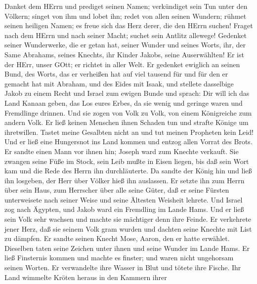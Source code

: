  Danket dem HErrn und prediget seinen Namen; verkündiget
sein Tun unter den Völkern;  singet von ihm und lobet ihn;
redet von allen seinen Wundern;  rühmet seinen heiligen
Namen; es freue sich das Herz derer, die den HErrn suchen! 
Fraget nach dem HErrn und nach seiner Macht; suchet sein Antlitz
allewege!  Gedenket seiner Wunderwerke, die er getan hat,
seiner Wunder und seines Worts,  ihr, der Same Abrahams,
seines Knechts, ihr Kinder Jakobs, seine Auserwählten!  Er
ist der HErr, unser GOtt; er richtet in aller Welt.  Er
gedenket ewiglich an seinen Bund, des Worts, das er verheißen hat auf
viel tausend für und für  den er gemacht hat mit Abraham,
und des Eides mit Isaak,  und stellete dasselbige Jakob zu
einem Recht und Israel zum ewigen Bunde  und sprach: Dir
will ich das Land Kanaan geben, das Los eures Erbes,  da
sie wenig und geringe waren und Fremdlinge drinnen.  Und
sie zogen von Volk zu Volk, von einem Königreiche zum andern Volk.
 Er ließ keinen Menschen ihnen Schaden tun und strafte
Könige um ihretwillen.  Tastet meine Gesalbten nicht an und
tut meinen Propheten kein Leid!  Und er ließ eine
Hungersnot ins Land kommen und entzog allen Vorrat des Brots.
 Er sandte einen Mann vor ihnen hin; Joseph ward zum
Knechte verkauft.  Sie zwangen seine Füße im Stock, sein
Leib mußte in Eisen liegen,  bis daß sein Wort kam und die
Rede des Herrn ihn durchläuterte.  Da sandte der König hin
und ließ ihn losgeben, der Herr über Völker hieß ihn auslassen.
 Er setzte ihn zum Herrn über sein Haus, zum Herrscher über
alle seine Güter,  daß er seine Fürsten unterweisete nach
seiner Weise und seine Ältesten Weisheit lehrete.  Und
Israel zog nach Ägypten, und Jakob ward ein Fremdling im Lande Hams.
 Und er ließ sein Volk sehr wachsen und machte sie
mächtiger denn ihre Feinde.  Er verkehrete jener Herz, daß
sie seinem Volk gram wurden und dachten seine Knechte mit List zu
dämpfen.  Er sandte seinen Knecht Mose, Aaron, den er hatte
erwählet.  Dieselben taten seine Zeichen unter ihnen und
seine Wunder im Lande Hams.  Er ließ Finsternis kommen und
machte es finster; und waren nicht ungehorsam seinen Worten.
 Er verwandelte ihre Wasser in Blut und tötete ihre Fische.
 Ihr Land wimmelte Kröten heraus in den Kammern ihrer
